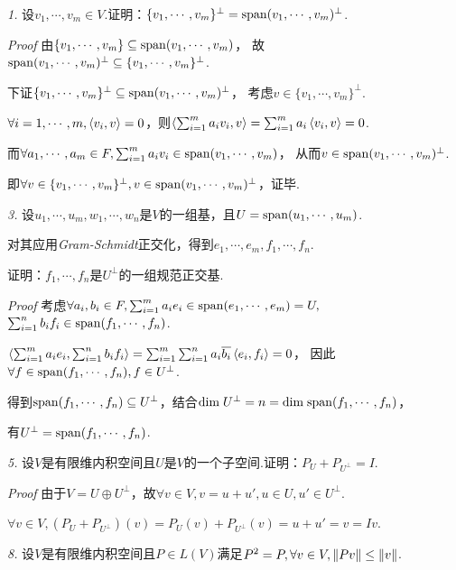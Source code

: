 \textit{1.}
设\(v_1,\cdots,v_m \in V\).证明：\(\{v_1,\cdots,v_m\}^\bot=\mathrm{span}(v_1,\cdots,v_m)^\bot\).

\textit{Proof}
由\(\{v_1,\cdots,v_m\} \subseteq \mathrm{span}(v_1,\cdots,v_m)\)，
故\(\mathrm{span}(v_1,\cdots,v_m)^\bot \subseteq \{v_1,\cdots,v_m\}^\bot\).

下证\(\{v_1,\cdots,v_m\}^\bot \subseteq \mathrm{span}(v_1,\cdots,v_m)^\bot\)，
考虑\(v \in \{v_1,\cdots,v_m\}^\bot\).

\(\forall i=1,\cdots,m,\left\langle v_i,v \right\rangle=0\)，则\(\left\langle \sum_{i=1}^m a_iv_i,v \right\rangle=\sum_{i=1}^m a_i\left\langle v_i,v \right\rangle=0\).

而\(\forall a_1,\cdots,a_m \in F,\sum_{i=1}^m a_iv_i \in \mathrm{span}(v_1,\cdots,v_m)\)，
从而\(v \in \mathrm{span}(v_1,\cdots,v_m)^\bot\).

即\(\forall v \in \{v_1,\cdots,v_m\}^\bot,v \in \mathrm{span}(v_1,\cdots,v_m)^\bot\)，证毕.

\hspace*{\fill}

\textit{3.}
设\(u_1,\cdots,u_m,w_1,\cdots,w_n\)是\(V\)的一组基，且\(U=\mathrm{span}(u_1,\cdots,u_m)\).

对其应用\textit{Gram-Schmidt}{\kaishu 正交化}，得到\(e_1,\cdots,e_m,f_1,\cdots,f_n\).

证明：\(f_1,\cdots,f_n\)是\(U^\bot\)的一组规范正交基.

\textit{Proof}
考虑\(\forall a_i,b_i \in F,\sum_{i=1}^m a_ie_i \in \mathrm{span}(e_1,\cdots,e_m)=U,\)
\(\sum_{i=1}^n b_if_i \in \mathrm{span}(f_1,\cdots,f_n)\).

\(\left\langle \sum_{i=1}^m a_ie_i,\sum_{i=1}^n b_if_i \right\rangle=\sum_{i=1}^m \sum_{i=1}^n a_i\overline{b_i} \left\langle e_i,f_i \right\rangle=0\)，
因此\(\forall f \in \mathrm{span}(f_1,\cdots,f_n), f\in U^\bot\).

得到\(\mathrm{span}(f_1,\cdots,f_n) \subseteq U^\bot\)，结合\(\mathrm{dim \;} U^\bot=n=\mathrm{dim \;} \mathrm{span}(f_1,\cdots,f_n)\)，

有\(U^\bot=\mathrm{span}(f_1,\cdots,f_n)\).

\hspace*{\fill}

\textit{5.}
设\(V\)是有限维内积空间且\(U\)是\(V\)的一个子空间.证明：\(P_U+P_{U^\bot}=I\).

\textit{Proof}
由于\(V=U \oplus U^\bot\)，故\(\forall v \in V,v=u+u',u \in U,u' \in U^\bot\).

\(\forall v \in V,(P_U+P_{U^\bot})(v)=P_U(v)+P_{U^\bot}(v)=u+u'=v=Iv\).

\hspace*{\fill}

\textit{8.}
设\(V\)是有限维内积空间且\(P \in L(V)\)满足\(P^2=P,\forall v \in V,\left\lVert Pv \right\rVert \leq \left\lVert v \right\rVert\).

